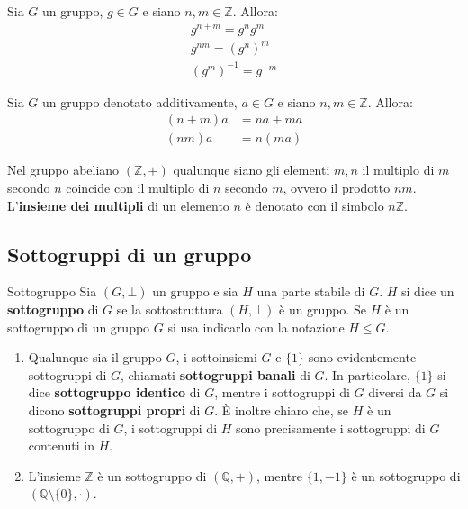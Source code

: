 \begin{propbox}
	Sia $G$ un gruppo, $g \in G$ e siano $n,m \in \mathbb{Z}$. Allora:
	\begin{eqnarray}
		g^{n+m}=g^{n}g^{m} \\
		g^{nm}=(g^{n})^{m} \\
		(g^{m})^{-1} = g^{-m}
	\end{eqnarray}
\end{propbox}

\begin{propbox}
	Sia $G$ un gruppo denotato additivamente, $a \in G$ e siano $n,m \in \mathbb{Z}$. Allora:
	\begin{eqnarray}
		(n+m)a &= na+ma\\
		(nm)a &= n(ma)
	\end{eqnarray}
\end{propbox}


\begin{osservation}
	Nel gruppo abeliano $(\mathbb{Z},+)$ qualunque siano gli elementi $m,n$ il multiplo di $m$ secondo $n$ coincide con il multiplo di $n$ secondo $m$, ovvero il prodotto $nm$. L'\textbf{insieme dei multipli} di un elemento $n$ è denotato con il simbolo $n\mathbb{Z}$.
\end{osservation}


\subsection{Sottogruppi di un gruppo}
\begin{defbox}{Sottogruppo}
	Sia $(G, \bot)$ un gruppo e sia $H$ una parte stabile di $G$. $H$ si dice un \textbf{sottogruppo} di $G$ se la sottostruttura $(H, \bot)$ è un gruppo. Se $H$ è un sottogruppo di un gruppo $G$ si usa indicarlo con la notazione $H \leq G$.
\end{defbox}

\begin{example}
\begin{enumerate}
	\item Qualunque sia il gruppo $G$, i sottoinsiemi $G$ e $\{1\}$ sono evidentemente sottogruppi di $G$, chiamati \textbf{sottogruppi banali} di $G$. In particolare, $\{1\}$ si dice \textbf{sottogruppo identico} di $G$, mentre i sottogruppi di $G$ diversi da $G$ si dicono \textbf{sottogruppi propri} di $G$. È inoltre chiaro che, se $H$ è un sottogruppo di $G$, i sottogruppi di $H$ sono precisamente i sottogruppi di $G$ contenuti in $H$.

	\item L'insieme $\mathbb{Z}$ è un sottogruppo di $(\mathbb{Q},+)$, mentre $\{1,-1\}$ è un sottogruppo di $(\mathbb{Q}\setminus \{0\}, \cdot)$.
\end{enumerate}
\end{example}

